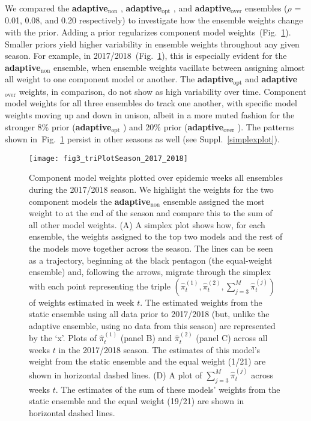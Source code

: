 \documentclass[12pt]{article}
\def\adaptNon{\textbf{adaptive$_{\text{non}}$ }}
\def\adaptOpt{\textbf{adaptive$_{\text{opt}}$ }}
\def\adaptOver{\textbf{adaptive$_{\text{over}}$ }}
\begin{document}
We compared the \adaptNon, \adaptOpt, and \adaptOver ensembles ($\rho$ = 0.01, 0.08, and 0.20 respectively) to investigate how the ensemble weights change with the prior.
Adding a prior regularizes component model weights~(Fig.~\ref{fig3.dorito}).
Smaller priors yield higher variability in ensemble weights throughout any given season. 
For example, in 2017/2018~(Fig.~\ref{fig3.dorito}), this is especially evident for the \adaptNon ensemble, when ensemble weights vacillate between assigning almost all weight to one component model or another.
The \adaptOpt and \adaptOver weights, in comparison, do not show as high variability over time.
Component model weights for all three ensembles do track one another, with specific model weights moving up and down in unison, albeit in a more muted fashion for the stronger 8\% prior (\adaptOpt) and 20\% prior (\adaptOver).
The patterns shown in~Fig.~\ref{fig3.dorito} persist in other seasons as well (see Suppl.~\ref{simplexplot}).

\graphicspath{{../_6_TLGs/_G/fig3_triPlot/}}
\begin{figure}[ht!]
    \centering
    \texttt{[image: fig3\_triPlotSeason\_2017\_2018]}
    \caption{
    Component model weights plotted over epidemic weeks all ensembles during the 2017/2018 season. 
    We highlight the weights for the two component models the \adaptNon ensemble assigned the most weight to at the end of the season and compare this to the sum of all other model weights. 
    (A) A simplex plot shows how, for each
    ensemble, the weights assigned to the top two models and the rest of the models move together across the season. 
    The lines can be seen as a trajectory, beginning at the black pentagon (the equal-weight ensemble) and, following the arrows, migrate through the simplex with each point representing the triple $(\hat\pi_t^{(1)}, \hat\pi_t^{(2)}, \sum_{j=3}^M\hat\pi_t^{(j)})$ of weights estimated in week $t$. The estimated weights from the static ensemble using all data prior to 2017/2018 (but, unlike the adaptive ensemble, using no data from this season) are represented by the `x'.
    Plots of $\hat\pi_t^{(1)}$ (panel B) and $\hat\pi_t^{(2)}$ (panel C) across all weeks $t$ in the 2017/2018 season. The estimates of this model's weight from the static ensemble and the equal weight (1/21) are shown in horizontal dashed lines.
    (D) A plot of $\sum_{j=3}^M\hat\pi_t^{(j)}$ across weeks $t$. The estimates of the sum of these models' weights from the static ensemble and the equal weight (19/21) are shown in horizontal dashed lines.
     \label{fig3.dorito}}
\end{figure}
\end{document}

